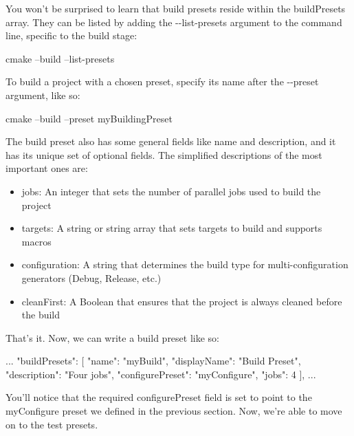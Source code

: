 You won’t be surprised to learn that build presets reside within the buildPresets array. They can be listed by adding the -{}-list-presets argument to the command line, specific to the build stage:

\begin{shell}
cmake --build --list-presets
\end{shell}

To build a project with a chosen preset, specify its name after the -{}-preset argument, like so:

\begin{shell}
cmake --build --preset myBuildingPreset
\end{shell}

The build preset also has some general fields like name and description, and it has its unique set of optional fields. The simplified descriptions of the most important ones are:

\begin{itemize}
\item
jobs: An integer that sets the number of parallel jobs used to build the project

\item
targets: A string or string array that sets targets to build and supports macros

\item
configuration: A string that determines the build type for multi-configuration generators (Debug, Release, etc.)

\item
cleanFirst: A Boolean that ensures that the project is always cleaned before the build
\end{itemize}

That’s it. Now, we can write a build preset like so:


\begin{json}
...
    "buildPresets": [
        {
            "name": "myBuild",
            "displayName": "Build Preset",
            "description": "Four jobs",
            "configurePreset": "myConfigure",
            "jobs": 4
        }
    ],
...
\end{json}

You’ll notice that the required configurePreset field is set to point to the myConfigure preset we defined in the previous section. Now, we’re able to move on to the test presets.


